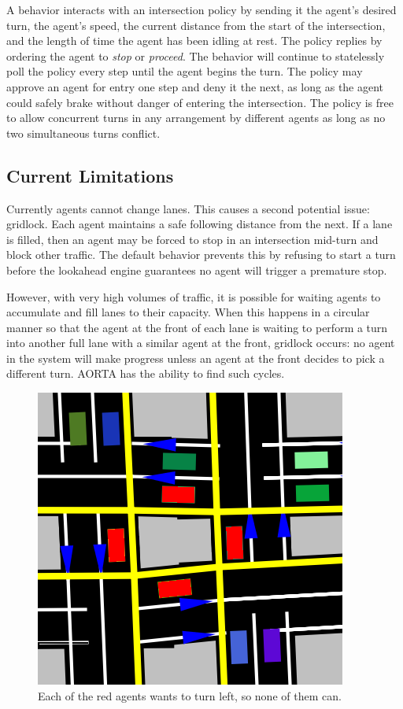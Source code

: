 \documentclass[letterpaper, 10 pt, conference]{ieeeconf}  %
\begin{document}
A behavior interacts with an intersection policy by sending it the agent's
desired turn, the agent's speed, the current distance from the start of the
intersection, and the length of time the agent has been idling at rest. The
policy replies by ordering the agent to \textit{stop} or \textit{proceed}. The behavior
will continue to statelessly poll the policy every step until the agent begins
the turn. The policy may approve an agent for entry one step and deny it the
next, as long as the agent could safely brake without danger of entering the
intersection. The policy is free to allow concurrent turns in any arrangement by
different agents as long as no two simultaneous turns conflict.

\subsection{Current Limitations}

Currently agents cannot change lanes. This causes a second potential issue:
gridlock.  Each agent maintains a safe following distance from the next. If a
lane is filled, then an agent may be forced to stop in an intersection mid-turn
and block other traffic. The default behavior prevents this by refusing to start
a turn before the lookahead engine guarantees no agent will trigger a premature
stop.

However, with very high volumes of traffic, it is possible for waiting agents to
accumulate and fill lanes to their capacity. When this happens in a circular
manner so that the agent at the front of each lane is waiting to perform a turn
into another full lane with a similar agent at the front, gridlock
\cite{AAAI11-au} occurs: no agent in the system will make progress unless an
agent at the front decides to pick a different turn. AORTA has the ability to
find such cycles.

\begin{figure}[h]
  \centering \includegraphics[scale=0.25]{gridlock.png}
  \caption{Each of the red agents wants to turn left, so none of them can.}
  \label{fig:gridlock}
  \vspace{-10pt}
\end{figure}
\end{document}
